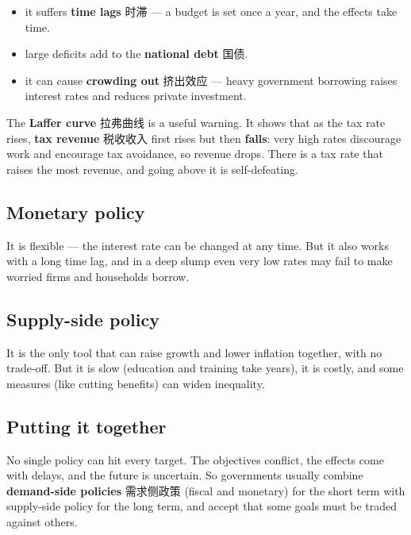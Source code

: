 \documentclass[11pt]{article}
\begin{document}
\begin{itemize}
\item it suffers \textbf{time lags} 时滞 — a budget is set once a year, and the effects take time.

\item large deficits add to the \textbf{national debt} 国债.

\item it can cause \textbf{crowding out} 挤出效应 — heavy government borrowing raises interest rates and reduces private investment.

\end{itemize}

The \textbf{Laffer curve} 拉弗曲线 is a useful warning. It shows that as the tax rate rises, \textbf{tax revenue} 税收收入 first rises but then \textbf{falls}: very high rates discourage work and encourage tax avoidance, so revenue drops. There is a tax rate that raises the most revenue, and going above it is self-defeating.

\subsection*{Monetary policy}

It is flexible — the interest rate can be changed at any time. But it also works with a long time lag, and in a deep slump even very low rates may fail to make worried firms and households borrow.

\subsection*{Supply-side policy}

It is the only tool that can raise growth and lower inflation together, with no trade-off. But it is slow (education and training take years), it is costly, and some measures (like cutting benefits) can widen inequality.

\subsection*{Putting it together}

No single policy can hit every target. The objectives conflict, the effects come with delays, and the future is uncertain. So governments usually combine \textbf{demand-side policies} 需求侧政策 (fiscal and monetary) for the short term with supply-side policy for the long term, and accept that some goals must be traded against others.
\end{document}
